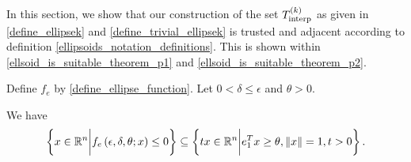 In this section, we show that our construction of the set ${T_{\text{interp}}^{(k)}}$ as given in 
\cref{define_ellipsek} and \cref{define_trivial_ellipsek}
is trusted and adjacent according to definition \cref{ellipsoids_notation_definitions}.
This is shown within \cref{ellsoid_is_suitable_theorem_p1} and \cref{ellsoid_is_suitable_theorem_p2}.

\begin{lemma}
\label{ellipse_in_cone}
Define $f_e$ by \cref{define_ellipse_function}.
Let $0 < \delta \le \epsilon$ and $\theta > 0$.

We have
\begin{align*}
\left\{x \in \mathbb R^n \bigg| f_e\left(\epsilon, \delta, \theta; x\right) \le 0\right\} \subseteq \left\{tx\in\mathbb R^n\bigg| e_1^T x \ge \theta,\|x\|=1, t>0\right\}.
\end{align*}
\end{lemma}

